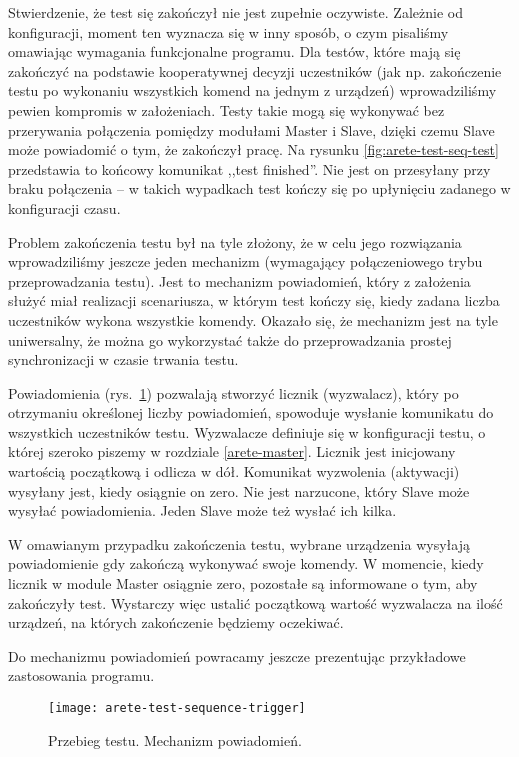 \documentclass[00-praca-magisterska.tex]{subfiles}
\begin{document}
Stwierdzenie, że test się zakończył nie jest zupełnie oczywiste. Zależnie od
konfiguracji, moment ten wyznacza się w inny sposób, o czym pisaliśmy omawiając
wymagania funkcjonalne programu. Dla testów, które mają się zakończyć na
podstawie kooperatywnej decyzji uczestników (jak np. zakończenie testu po
wykonaniu wszystkich komend na jednym z urządzeń) wprowadziliśmy pewien
kompromis w założeniach. Testy takie mogą się wykonywać bez przerywania
połączenia pomiędzy modułami Master i Slave, dzięki czemu Slave może powiadomić
o tym, że zakończył pracę. Na rysunku \ref{fig:arete-test-seq-test} przedstawia
to końcowy komunikat ,,test finished''. Nie jest on przesyłany przy braku
połączenia -- w takich wypadkach test kończy się po upłynięciu zadanego w
konfiguracji czasu.

Problem zakończenia testu był na tyle złożony, że w celu jego rozwiązania
wprowadziliśmy jeszcze jeden mechanizm (wymagający połączeniowego trybu
przeprowadzania testu). Jest to mechanizm powiadomień, który z założenia służyć
miał realizacji scenariusza, w którym test kończy się, kiedy zadana liczba
uczestników wykona wszystkie komendy. Okazało się, że mechanizm jest na tyle
uniwersalny, że można go wykorzystać także do przeprowadzania prostej
synchronizacji w czasie trwania testu.

Powiadomienia (rys.~\ref{fig:arete-test-seq-trigger}) pozwalają stworzyć
licznik (wyzwalacz), który po otrzymaniu określonej liczby powiadomień,
spowoduje wysłanie komunikatu do wszystkich uczestników testu. Wyzwalacze
definiuje się w konfiguracji testu, o której szeroko piszemy w rozdziale
\ref{arete-master}. Licznik jest inicjowany wartością początkową i odlicza w
dół. Komunikat wyzwolenia (aktywacji) wysyłany jest, kiedy osiągnie on zero.
Nie jest narzucone, który Slave może wysyłać powiadomienia. Jeden Slave może
też wysłać ich kilka.

W omawianym przypadku zakończenia testu, wybrane urządzenia wysyłają
powiadomienie gdy zakończą wykonywać swoje komendy. W momencie, kiedy licznik w
module Master osiągnie zero, pozostałe są informowane o tym, aby zakończyły
test. Wystarczy więc ustalić początkową wartość wyzwalacza na ilość urządzeń,
na których zakończenie będziemy oczekiwać.

Do mechanizmu powiadomień powracamy jeszcze prezentując przykładowe
zastosowania programu.

\begin{figure}
\begin{center}
\leavevmode
\texttt{[image: arete-test-sequence-trigger]}
\end{center}
\caption{Przebieg testu. Mechanizm powiadomień.}
\label{fig:arete-test-seq-trigger}
\end{figure}
\end{document}
